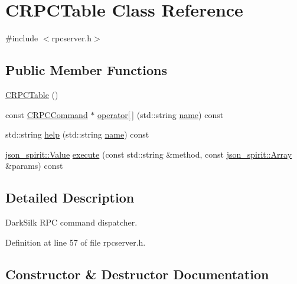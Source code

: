 \hypertarget{class_c_r_p_c_table}{}\section{C\+R\+P\+C\+Table Class Reference}
\label{class_c_r_p_c_table}


{\ttfamily \#include $<$rpcserver.\+h$>$}

\subsection*{Public Member Functions}
\begin{DoxyCompactItemize}
\item 
\hyperlink{class_c_r_p_c_table_a2e6e624bae4c149db2f5cbe0de84b121}{C\+R\+P\+C\+Table} ()
\item 
const \hyperlink{class_c_r_p_c_command}{C\+R\+P\+C\+Command} $\ast$ \hyperlink{class_c_r_p_c_table_a687ec69eb823d5f4e4dbc16f497681bf}{operator\mbox{[}$\,$\mbox{]}} (std\+::string \hyperlink{testharness_8cc_a8f8f80d37794cde9472343e4487ba3eb}{name}) const 
\item 
std\+::string \hyperlink{class_c_r_p_c_table_a220ae5b4ce013c79d097bfe96a94e2f0}{help} (std\+::string \hyperlink{testharness_8cc_a8f8f80d37794cde9472343e4487ba3eb}{name}) const 
\item 
\hyperlink{namespacejson__spirit_a28e6abc99fda7b06c430ca38802527a3}{json\+\_\+spirit\+::\+Value} \hyperlink{class_c_r_p_c_table_aebba8d5a8f62089d1aa63278dbaf30a2}{execute} (const std\+::string \&method, const \hyperlink{namespacejson__spirit_aee299e52bda3816039a53210cbbfea1a}{json\+\_\+spirit\+::\+Array} \&params) const 
\end{DoxyCompactItemize}


\subsection{Detailed Description}
Dark\+Silk R\+P\+C command dispatcher. 

Definition at line 57 of file rpcserver.\+h.



\subsection{Constructor \& Destructor Documentation}
\hypertarget{class_c_r_p_c_table_a2e6e624bae4c149db2f5cbe0de84b121}{}
